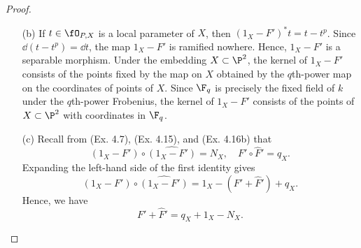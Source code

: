 \documentclass[a4paper]{article}
\begin{document}
\begin{enumerate} [label=\textbf{\arabic*.}, leftmargin=0em]
\begin{proof}
\begin{itemize} [leftmargin=0cm]
                        Under this indentification, $F' : X_q \to X$ is obtained from the restriction of the Frobenius on $\P^2$.
                        The $k$-linear Frobenius morphism on an affine coordinate ring of $\P^2$ can be written as
                        \begin{align*}
                            F^* : k[x, y] & \to k[x, y]          \\
                            g(x, y)       & \mapsto g(x^q, y^q),
                        \end{align*}
                        which is exactly the ring homomorphism that gives the $q$th-power map on the coordinates.

                  \item[(b)] If $t \in \fO_{P, X}$ is a local parameter of $X$, then $(1_X - F')^*t = t - t^p$.
                        Since $\dd(t - t^p) = \dd t$, the map $1_X - F'$ is ramified nowhere.
                        Hence, $1_X - F'$ is a separable morphism.
                        Under the embedding $X \subset \P^2$, the kernel of $1_X - F'$ consists of the points fixed by the map on $X$ obtained by the $q$th-power map on the coordinates of points of $X$.
                        Since $\F_q$ is precisely the fixed field of $k$ under the $q$th-power Frobenius, the kernel of $1_X - F'$ consists of the points of $X \subset \P^2$ with coordinates in $\F_q$.

                  \item[(c)] Recall from (Ex. 4.7), (Ex. 4.15), and (Ex. 4.16b) that
                        \begin{equation*}
                            (1_X-F')\circ\widehat{(1_X-F')}=N_X, \quad F'\circ\hat F'=q_X.
                        \end{equation*}
                        Expanding the left-hand side of the first identity gives
                        \begin{equation*}
                            (1_X-F')\circ\widehat{(1_X-F')} = 1_X-(F'+\hat F') + q_X.
                        \end{equation*}
                        Hence, we have
                        \begin{equation*}
                            F' + \hat F' = q_X + 1_X - N_X.
                        \end{equation*}


\end{itemize}
\end{proof}
\end{enumerate}
\end{document}
